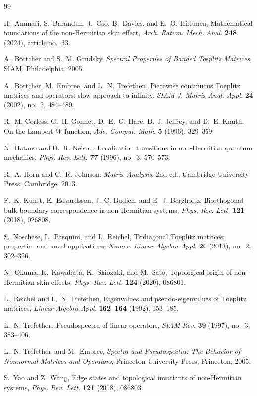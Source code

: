 \documentclass[11pt]{amsart}
\numberwithin{equation}{section}
\begin{document}
\begin{thebibliography}{99}

H.~Ammari, S.~Barandun, J.~Cao, B.~Davies, and E.~O. Hiltunen,
Mathematical foundations of the non-Hermitian skin effect,
\emph{Arch. Ration. Mech. Anal.} \textbf{248} (2024), article no.~33.

A.~B\"ottcher and S.~M. Grudsky,
\emph{Spectral Properties of Banded Toeplitz Matrices},
SIAM, Philadelphia, 2005.

A.~B\"ottcher, M.~Embree, and L.~N. Trefethen,
Piecewise continuous Toeplitz matrices and operators: slow approach to infinity,
\emph{SIAM J. Matrix Anal. Appl.} \textbf{24} (2002), no.~2, 484--489.

R.~M. Corless, G.~H. Gonnet, D.~E.~G. Hare, D.~J. Jeffrey, and D.~E. Knuth,
On the Lambert \(W\) function,
\emph{Adv. Comput. Math.} \textbf{5} (1996), 329--359.

N.~Hatano and D.~R. Nelson,
Localization transitions in non-Hermitian quantum mechanics,
\emph{Phys. Rev. Lett.} \textbf{77} (1996), no.~3, 570--573.

R.~A. Horn and C.~R. Johnson,
\emph{Matrix Analysis},
2nd ed.,
Cambridge University Press, Cambridge, 2013.

F.~K. Kunst, E.~Edvardsson, J.~C. Budich, and E.~J. Bergholtz,
Biorthogonal bulk-boundary correspondence in non-Hermitian systems,
\emph{Phys. Rev. Lett.} \textbf{121} (2018), 026808.

S.~Noschese, L.~Pasquini, and L.~Reichel,
Tridiagonal Toeplitz matrices: properties and novel applications,
\emph{Numer. Linear Algebra Appl.} \textbf{20} (2013), no.~2, 302--326.

N.~Okuma, K.~Kawabata, K.~Shiozaki, and M.~Sato,
Topological origin of non-Hermitian skin effects,
\emph{Phys. Rev. Lett.} \textbf{124} (2020), 086801.

L.~Reichel and L.~N. Trefethen,
Eigenvalues and pseudo-eigenvalues of Toeplitz matrices,
\emph{Linear Algebra Appl.} \textbf{162--164} (1992), 153--185.

L.~N. Trefethen,
Pseudospectra of linear operators,
\emph{SIAM Rev.} \textbf{39} (1997), no.~3, 383--406.

L.~N. Trefethen and M.~Embree,
\emph{Spectra and Pseudospectra: The Behavior of Nonnormal Matrices and Operators},
Princeton University Press, Princeton, 2005.

S.~Yao and Z.~Wang,
Edge states and topological invariants of non-Hermitian systems,
\emph{Phys. Rev. Lett.} \textbf{121} (2018), 086803.

\end{thebibliography}
\end{document}
